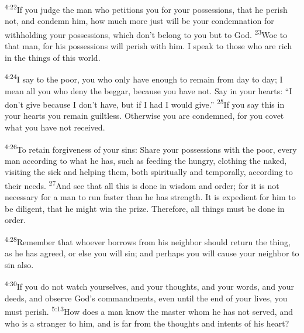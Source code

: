 \documentclass[openany,12pt,english]{book}
\newenvironment{para}{\par\pretolerance=100\tolerance=200\setlength{\emergencystretch}{0.6em}\relax}{\par}
\begin{document}
\begin{para}
    \textsuperscript{4:22}\thinspace{}If you judge the man who petitions you for your possessions, that he per\-ish not, and con\-demn him, how much more just will be your con\-dem\-na\-tion for with\-hold\-ing your possessions, which don't be\-long to you but to God.
    \textsuperscript{23}\thinspace{}Woe to that man, for his possessions will per\-ish with him. I speak to those who are rich in the things of this world.
\end{para}

\begin{para}
    \textsuperscript{4:24}\thinspace{}I say to the poor, you who on\-ly have e\-nough to re\-main from day to day; I mean all you who de\-ny the beg\-gar, be\-cause you have not. Say in your hearts: “I don't give be\-cause I don't have, but if I had I would give.”
    \textsuperscript{25}\thinspace{}If you say this in your hearts you re\-main guilt\-less. Oth\-er\-wise you are condemned, for you cov\-et what you have not re\-ceived.
\end{para}

\begin{para}
    \textsuperscript{4:26}\thinspace{}To re\-tain for\-give\-ness of your sins: Share your possessions with the poor, eve\-ry man ac\-cord\-ing to what he has, such as feed\-ing the hun\-gry, cloth\-ing the na\-ked, visiting the sick and help\-ing them, both spiritually and tem\-po\-ral\-ly, ac\-cord\-ing to their needs.
    \textsuperscript{27}\thinspace{}And see that all this is done in wis\-dom and or\-der; for it is not nec\-es\-sar\-y for a man to run faster than he has strength. It is ex\-pe\-di\-ent for him to be dil\-i\-gent, that he might win the prize. There\-fore, all things must be done in or\-der.
\end{para}

\begin{para}
    \textsuperscript{4:28}\thinspace{}Re\-mem\-ber that who\-ev\-er borrows from his neigh\-bor should re\-turn the thing, as he has a\-greed, or else you will sin; and per\-haps you will cause your neigh\-bor to sin al\-so.
\end{para}

\begin{para}
    \textsuperscript{4:30}\thinspace{}If you do not watch your\-selves, and your thoughts, and your words, and your deeds, and ob\-serve God's commandments, e\-ven un\-til the end of your lives, you must per\-ish.
    \textsuperscript{5:13}\thinspace{}How does a man know the mas\-ter whom he has not served, and who is a strang\-er to him, and is far from the thoughts and intents of his heart?
\end{para}
\end{document}
